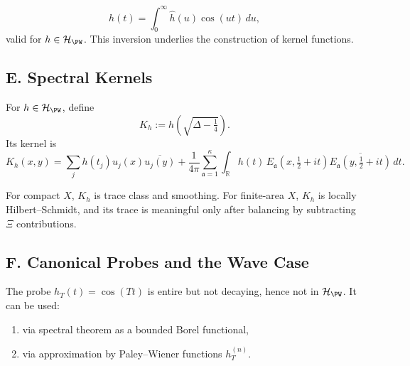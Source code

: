 \begin{remark}
\[
  h(t)=\int_0^\infty \hat h(u)\cos(ut)\,du,
\]
valid for $h\in\mathcal H_{\PW}$. This inversion underlies the construction of kernel functions.
\end{remark}


\subsection*{E. Spectral Kernels}
\label{subsec:spectral-kernels-part2}

\begin{definition}
\label{def:spectral-kernel-part2}
For $h\in\mathcal H_{\PW}$, define
\[
  K_h:=h\!\left(\sqrt{\Delta-\tfrac14}\right).
\]
Its kernel is
\[
  K_h(x,y)=\sum_j h(t_j)u_j(x)\overline{u_j(y)}+
  \frac{1}{4\pi}\sum_{\mathfrak a=1}^{\kappa}\int_{\mathbb R} h(t)\,E_{\mathfrak a}(x,\tfrac12+it)\overline{E_{\mathfrak a}(y,\tfrac12+it)}\,dt.
\]
\end{definition}

\begin{remark}
For compact $X$, $K_h$ is trace class and smoothing. For finite-area $X$, $K_h$ is locally Hilbert–Schmidt, and its trace is meaningful only after balancing by subtracting $\Xi$ contributions.
\end{remark}


\subsection*{F. Canonical Probes and the Wave Case}
\label{subsec:probes-part2}

\begin{remark}
The probe $h_T(t)=\cos(Tt)$ is entire but not decaying, hence not in $\mathcal H_{\PW}$. It can be used:
\begin{enumerate}[label=(\alph*)]
  \item via spectral theorem as a bounded Borel functional,
  \item via approximation by Paley–Wiener functions $h_T^{(n)}$.
\end{enumerate}
\end{remark}

